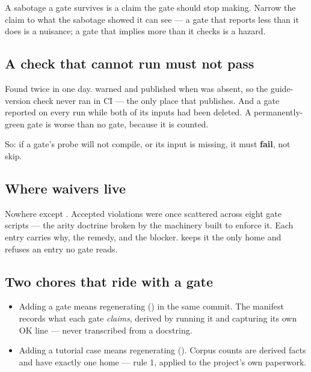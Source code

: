 \documentclass[11pt,a4paper]{article}
\begin{document}
\begin{keyidea}
A sabotage a gate survives is a claim the gate should stop making. Narrow the
claim to what the sabotage showed it can see --- a gate that reports less than
it does is a nuisance; a gate that implies more than it checks is a hazard.
\end{keyidea}

\subsection{A check that cannot run must not pass}

Found twice in one day.  warned and published when
 was absent, so the guide-version check never ran in CI --- the
only place that publishes. And a gate reported  on every run while
both of its inputs had been deleted. A permanently-green gate is worse than no
gate, because it is counted.

So: if a gate's probe will not compile, or its input is missing, it must
\textbf{fail}, not skip.

\subsection{Where waivers live}

Nowhere except . Accepted violations were
once scattered across eight gate scripts --- the arity doctrine broken by the
machinery built to enforce it. Each entry carries why, the remedy, and the
blocker.  keeps it the only home and refuses an
entry no gate reads.

\subsection{Two chores that ride with a gate}

\begin{itemize}[leftmargin=*]
  \item Adding a gate means regenerating
         ()
        in the same commit. The manifest records what each gate \emph{claims},
        derived by running it and capturing its own OK line --- never
        transcribed from a docstring.
  \item Adding a tutorial case means regenerating
        (). Corpus counts are derived
        facts and have exactly one home --- rule 1, applied to the project's
        own paperwork.
\end{itemize}
\end{document}
